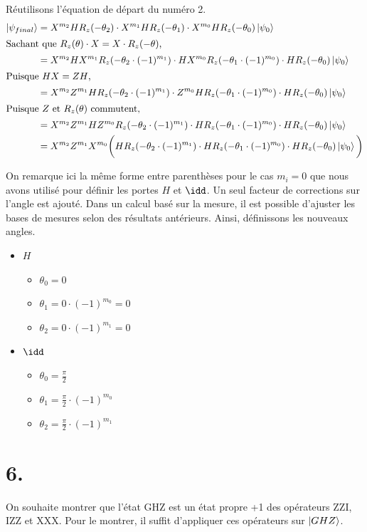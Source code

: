 \documentclass{article}
\begin{document}
Réutilisons l'équation de départ du numéro 2.
\begin{align*}
    \ket{\psi_{final}}&= X^{m_2}HR_z(-\theta_2)\cdot X^{m_1}HR_z(-\theta_1)\cdot X^{m_0}HR_z(-\theta_0)\ket{\psi_0}\\
    \intertext{Sachant que $R_z(\theta)\cdot X=X\cdot R_z(-\theta)$,}
    &= X^{m_2}HX^{m_1}R_z(-\theta_2\cdot (-1)^{m_1})\cdot HX^{m_0}R_z(-\theta_1\cdot (-1)^{m_0})\cdot HR_z(-\theta_0)\ket{\psi_0}\\
    \intertext{Puisque $HX=ZH$,}
    &= X^{m_2}Z^{m_1}HR_z(-\theta_2\cdot (-1)^{m_1})\cdot Z^{m_0}HR_z(-\theta_1\cdot (-1)^{m_0})\cdot HR_z(-\theta_0)\ket{\psi_0}\\
    \intertext{Puisque $Z$ et $R_z(\theta)$ commutent,}
    &= X^{m_2}Z^{m_1}HZ^{m_0}R_z(-\theta_2\cdot (-1)^{m_1})\cdot HR_z(-\theta_1\cdot (-1)^{m_0})\cdot HR_z(-\theta_0)\ket{\psi_0}\\
    &= X^{m_2}Z^{m_1}X^{m_0}\bigg(HR_z(-\theta_2\cdot (-1)^{m_1})\cdot HR_z(-\theta_1\cdot (-1)^{m_0})\cdot HR_z(-\theta_0)\ket{\psi_0}\bigg)\\
\end{align*}

On remarque ici la même forme entre parenthèses pour le cas $m_i=0$ que nous avons utilisé pour définir les portes $H$ et $\idd$. Un seul facteur de corrections sur l'angle est ajouté. Dans un calcul basé sur la mesure, il est possible d'ajuster les bases de mesures selon des résultats antérieurs. Ainsi, définissons les nouveaux angles.
\begin{itemize}
    \item $H$
    \begin{itemize}
        \item $\theta_0=0$
        \item $\theta_1=0\cdot (-1)^{m_0}=0$
        \item $\theta_2=0\cdot (-1)^{m_1}=0$
    \end{itemize}
    \item $\idd$
    \begin{itemize}
        \item $\theta_0=\frac{\pi}{2}$
        \item $\theta_1=\frac{\pi}{2}\cdot (-1)^{m_0}$
        \item $\theta_2=\frac{\pi}{2}\cdot (-1)^{m_1}$
    \end{itemize}
\end{itemize}

\section*{6.}
On souhaite montrer que l'état GHZ est un état propre +1 des opérateurs ZZI, IZZ et XXX. Pour le montrer, il suffit d'appliquer ces opérateurs sur $\ket{GHZ}$.
\end{document}
